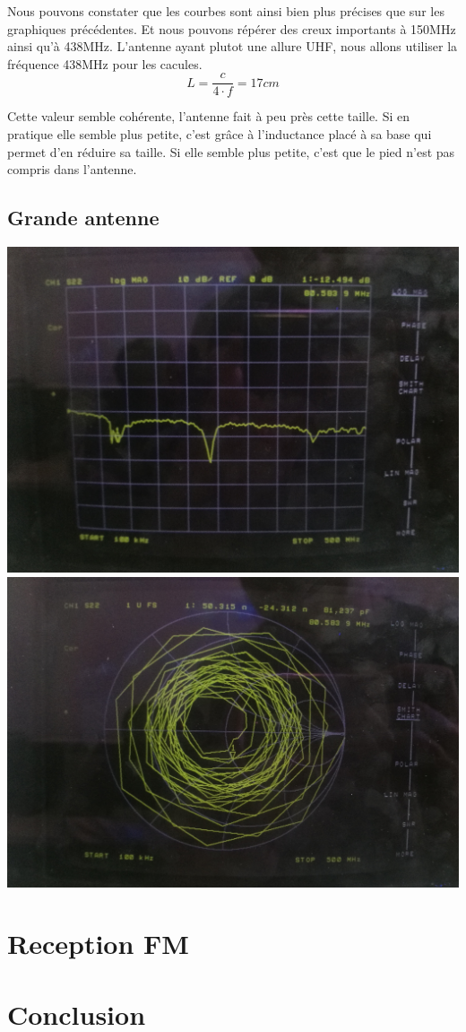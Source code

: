 \documentclass[a4paper,12pt]{report}            %
\begin{document}
Nous pouvons constater que les courbes sont ainsi bien plus précises que sur les graphiques précédentes.
Et nous pouvons répérer des creux importants à 150MHz ainsi qu'à 438MHz. L'antenne ayant plutot une allure 
UHF, nous allons utiliser la fréquence 438MHz pour les cacules. 
$$ L = \frac{c}{4\cdot f} = 17cm$$

Cette valeur semble cohérente, l'antenne fait à peu près cette taille. Si en pratique elle semble 
plus petite, c'est grâce à l'inductance placé à sa base qui permet d'en réduire sa taille. Si elle 
semble plus petite, c'est que le pied n'est pas compris dans l'antenne.

\section {Grande antenne}

\begin{center}
	\includegraphics[scale = 0.062]{pic/S_grande.jpg}
	\includegraphics[scale = 0.065]{pic/Smith_grande.jpg} 
\end{center}

\chapter{Reception FM}

\chapter{Conclusion}
\end{document}
